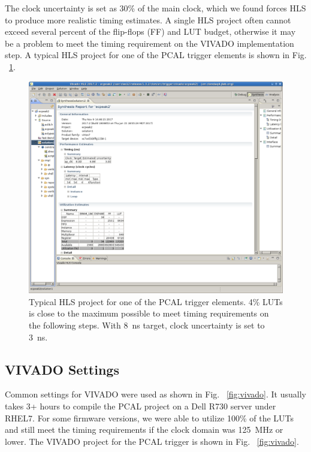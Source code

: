 The clock uncertainty is set as 30\% of the main clock, which we found forces HLS to produce more realistic timing estimates. A single HLS project often cannot exceed several percent of the flip-flops (FF) and LUT budget, otherwise it may be a problem to meet the timing requirement on the VIVADO implementation step. A typical HLS project for one of the PCAL trigger elements is shown in Fig. ~\ref{fig:hls}.

\begin{figure}[hbt]
	\centering
	\includegraphics[width=1.0\columnwidth,keepaspectratio]{img/hls.png}
	\caption{Typical HLS project for one of the PCAL trigger elements. 4\% LUTs is close to the maximum possible to meet timing requirements on the following steps. With 8~ns target, clock uncertainty  is set to 3~ns.}
	\label{fig:hls}
\end{figure}

\subsection{VIVADO Settings}

Common settings for VIVADO were used as shown in Fig. ~\ref{fig:vivado}. It usually takes 3+ hours to compile the PCAL project on a Dell R730 server under RHEL7. For some firmware versions, we were able to utilize 100\% of the LUTs and still meet the timing requirements if the clock domain was 125~MHz or lower. The VIVADO project for the PCAL trigger is shown in Fig. ~\ref{fig:vivado}.

